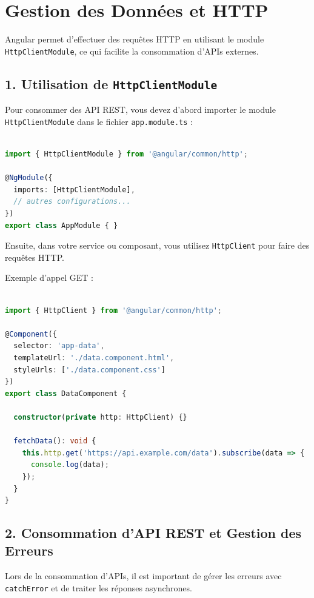 \documentclass{article}
\begin{document}
\section*{Gestion des Données et HTTP}

Angular permet d'effectuer des requêtes HTTP en utilisant le module \texttt{HttpClientModule}, ce qui facilite la consommation d'APIs externes.

\subsection*{1. Utilisation de \texttt{HttpClientModule}}

Pour consommer des API REST, vous devez d'abord importer le module \texttt{HttpClientModule} dans le fichier \texttt{app.module.ts} :

\begin{lstlisting}[language=TypeScript, caption={Using a service in a component}, label={lst:typescript-service-usage}]

import { HttpClientModule } from '@angular/common/http';

@NgModule({
  imports: [HttpClientModule],
  // autres configurations...
})
export class AppModule { }
\end{lstlisting}

Ensuite, dans votre service ou composant, vous utilisez \texttt{HttpClient} pour faire des requêtes HTTP.

Exemple d'appel GET :
\begin{lstlisting}[language=TypeScript, caption={Using a service in a component}, label={lst:typescript-service-usage}]

import { HttpClient } from '@angular/common/http';

@Component({
  selector: 'app-data',
  templateUrl: './data.component.html',
  styleUrls: ['./data.component.css']
})
export class DataComponent {

  constructor(private http: HttpClient) {}

  fetchData(): void {
    this.http.get('https://api.example.com/data').subscribe(data => {
      console.log(data);
    });
  }
}
\end{lstlisting}

\subsection*{2. Consommation d’API REST et Gestion des Erreurs}

Lors de la consommation d'APIs, il est important de gérer les erreurs avec \texttt{catchError} et de traiter les réponses asynchrones.
\end{document}
